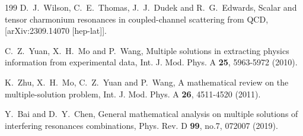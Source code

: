 \documentclass[final,5p,times,twocolumn]{elsarticle}
\begin{document}
\begin{thebibliography}{199}
D.~J.~Wilson, C.~E.~Thomas, J.~J.~Dudek and R.~G.~Edwards,
Scalar and tensor charmonium resonances in coupled-channel scattering from QCD,
[arXiv:2309.14070 [hep-lat]].

C.~Z.~Yuan, X.~H.~Mo and P.~Wang,
Multiple solutions in extracting physics information from experimental data,
Int. J. Mod. Phys. A \textbf{25}, 5963-5972 (2010).


K.~Zhu, X.~H.~Mo, C.~Z.~Yuan and P.~Wang,
A mathematical review on the multiple-solution problem,
Int. J. Mod. Phys. A \textbf{26}, 4511-4520 (2011).



Y.~Bai and D.~Y.~Chen,
General mathematical analysis on multiple solutions of interfering resonances combinations,
Phys. Rev. D \textbf{99}, no.7, 072007 (2019).



\end{thebibliography}
\end{document}
